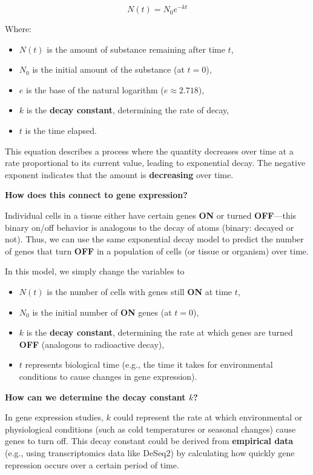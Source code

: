 \documentclass[11pt]{report}
\begin{document}
{\begin{tcolorbox}[title=Exponential Decay and Biological Gene Expression, coltitle=AntiqueWhite1]
	\[
	N(t) = N_0 e^{-kt}
	\]
	
	Where:
	\begin{itemize}
		\item \( N(t) \) is the amount of substance remaining after time \( t \),
		\item \( N_0 \) is the initial amount of the substance (at \( t = 0 \)),
		\item \( e \) is the base of the natural logarithm (\( e \approx 2.718 \)),
		\item \( k \) is the \textbf{decay constant}, determining the rate of decay,
		\item \( t \) is the time elapsed.
	\end{itemize}
	
	This equation describes a process where the quantity decreases over time at a rate proportional to its current value, leading to exponential decay. The negative exponent indicates that the amount is \textbf{decreasing} over time.
	
	\textbf{How does this connect to gene expression?} 
	
	Individual cells in a tissue either have certain genes \textbf{ON} or turned \textbf{OFF}—this binary on/off behavior is analogous to the decay of atoms (binary: decayed or not). Thus, we can use the same exponential decay model to predict the number of genes that turn \textbf{OFF} in a population of cells (or tissue or organism) over time.
	
	In this model, we simply change the variables to 
	\begin{itemize}
		\item \( N(t) \) is the number of cells with genes still \textbf{ON} at time \( t \),
		\item \( N_0 \) is the initial number of \textbf{ON} genes (at \( t = 0 \)),
		\item \( k \) is the \textbf{decay constant}, determining the rate at which genes are turned \textbf{OFF} (analogous to radioactive decay),
		\item \( t \) represents biological time (e.g., the time it takes for environmental conditions to cause changes in gene expression).
	\end{itemize}
	
	\textbf{How can we determine the decay constant \( k \)?} 
	
	In gene expression studies, \( k \) could represent the rate at which environmental or physiological conditions (such as cold temperatures or seasonal changes) cause genes to turn off. This decay constant could be derived from \textbf{empirical data} (e.g., using transcriptomics data like DeSeq2) by calculating how quickly gene repression occurs over a certain period of time.
	

\end{tcolorbox}}
\end{document}
